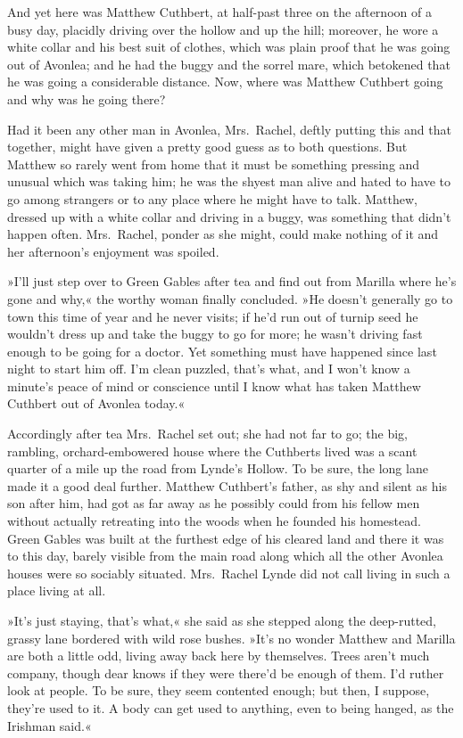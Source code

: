 And yet here was Matthew Cuthbert, at half-past three on the afternoon of a busy day, placidly driving over the hollow and up the hill; moreover, he wore a white collar and his best suit of clothes, which was plain proof that he was going out of Avonlea; and he had the buggy and the sorrel mare, which betokened that he was going a considerable distance. Now, where was Matthew Cuthbert going and why was he going there?

Had it been any other man in Avonlea, Mrs.~Rachel, deftly putting this and that together, might have given a pretty good guess as to both questions. But Matthew so rarely went from home that it must be something pressing and unusual which was taking him; he was the shyest man alive and hated to have to go among strangers or to any place where he might have to talk. Matthew, dressed up with a white collar and driving in a buggy, was something that didn't happen often. Mrs.~Rachel, ponder as she might, could make nothing of it and her afternoon's enjoyment was spoiled.

»I'll just step over to Green Gables after tea and find out from Marilla where he's gone and why,« the worthy woman finally concluded. »He doesn't generally go to town this time of year and he never visits; if he'd run out of turnip seed he wouldn't dress up and take the buggy to go for more; he wasn't driving fast enough to be going for a doctor. Yet something must have happened since last night to start him off. I'm clean puzzled, that's what, and I won't know a minute's peace of mind or conscience until I know what has taken Matthew Cuthbert out of Avonlea today.«

Accordingly after tea Mrs.~Rachel set out; she had not far to go; the big, rambling, orchard-embowered house where the Cuthberts lived was a scant quarter of a mile up the road from Lynde's Hollow. To be sure, the long lane made it a good deal further. Matthew Cuthbert's father, as shy and silent as his son after him, had got as far away as he possibly could from his fellow men without actually retreating into the woods when he founded his homestead. Green Gables was built at the furthest edge of his cleared land and there it was to this day, barely visible from the main road along which all the other Avonlea houses were so sociably situated. Mrs.~Rachel Lynde did not call living in such a place living at all.

»It's just staying, that's what,« she said as she stepped along the deep-rutted, grassy lane bordered with wild rose bushes. »It's no wonder Matthew and Marilla are both a little odd, living away back here by themselves. Trees aren't much company, though dear knows if they were there'd be enough of them. I'd ruther look at people. To be sure, they seem contented enough; but then, I suppose, they're used to it. A body can get used to anything, even to being hanged, as the Irishman said.«

